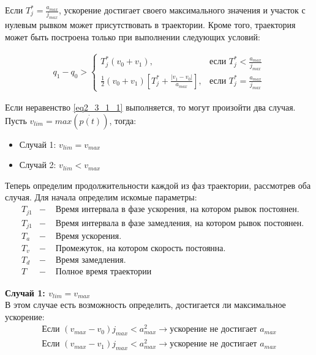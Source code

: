	Если $T_{j}^{*} = \frac{a_{max}}{j_{max}}$, ускорение достигает своего максимального значения и участок с нулевым рывком может присутствовать в траектории. Кроме того, траектория может быть построена только при выполнении следующих условий:
	
	\begin{align} \label{eq2_3_1_1}
		q_{1} - q_{0} >
		\begin{cases}
			T_{j}^{*}(v_{0} + v_{1}),				&\text{если } T_{j}^{*} < \frac{a_{max}}{j_{max}}\\
			\frac{1}{2}(v_{0} + v_{1}) \left[ T_{j}^{*} + \frac{|v_{1} - v_{0}|}{a_{max}} \right],	&\text{если } T_{j}^{*} = \frac{a_{max}}{j_{max}}
		\end{cases}
	\end{align}

	Если неравенство \ref{eq2_3_1_1} выполняется, то могут произойти два случая. Пусть $v_{lim} = max(\dot{p(t)})$, тогда:
	\begin{itemize}
		\item Случай 1: $v_{lim} = v_{max}$
		\item Случай 2: $v_{lim} < v_{max}$
	\end{itemize}
	
	Теперь определим продолжительности каждой из фаз траектории, рассмотрев оба случая. Для начала определим искомые параметры:
	\begin{align*}
	&T_{j1}		&-	& \text{ Время интервала в фазе ускорения, на котором рывок постоянен.}\\
	&T_{j1}		&-	& \text{ Время интервала в фазе замедления, на котором рывок постоянен.}\\
	&T_{a}		&-	& \text{ Время ускорения.}\\
	&T_{v}		&-	& \text{ Промежуток, на котором скорость постоянна.}\\
	&T_{d}		&-	& \text{ Время замедления.}\\
	&T			&-	& \text{ Полное время траектории}
	\end{align*}

	\textbf{Случай 1: $v_{lim} = v_{max}$}\\
	В этом случае есть возможность определить, достигается ли максимальное ускорение:
	\begin{align}
		\text{Если } (v_{max} - v_{0})j_{max} < a_{max}^{2} \rightarrow \text{ускорение не достигает } a_{max} \label{eq2_3_1_2} \\		
		\text{Если } (v_{max} - v_{1})j_{max} < a_{max}^{2} \rightarrow \text{ускорение не достигает } a_{max} \label{eq2_3_1_3}
	\end{align}

